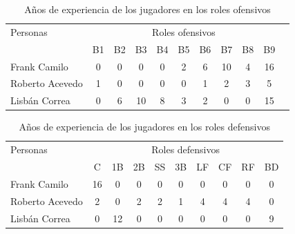 

\begin{table}[H]
		\centering
	\caption{Años de experiencia de los jugadores en los roles ofensivos}\label{exp-of}
		\begin{tabular}{l | c c c c c c c c c c}
			\toprule[1.7pt]
			\multicolumn{1}{l}{Personas}   &    \multicolumn{9}{c}{Roles ofensivos}    &  \\ \cline{1-10}
			                                                              & B1 & B2 & B3 & B4 & B5 & B6 & B7 & B8 & B9 &  \\ \cline{2-10}
			Frank Camilo                                                 & 0  & 0  & 0  & 0  & 2  & 6  & 10 & 4  & 16 &  \\
			Roberto Acevedo                                              & 1  & 0  & 0  & 0  & 0  & 1  & 2  & 3  & 5  &  \\
			Lisbán Correa                                                & 0  & 6  & 10 & 8  & 3  & 2  & 0  & 0  & 15 &  \\
			\bottomrule[1pt]                              
		\end{tabular}
	
\end{table}


\begin{table}[H]
	\centering
	\caption{Años de experiencia de los jugadores en los roles defensivos}\label{exp-def}

	\begin{tabular}{l | c c c c c c c c c }
		\toprule[1.7pt]
		\multicolumn{1}{l}{Personas} &    \multicolumn{9}{c}{Roles defensivos}  \\ \cline{1-10}
		                                                           & C  & 1B & 2B & SS & 3B & LF & CF & RF & BD \\ \cline{2-10}
		Frank Camilo                                               & 16 & 0  & 0  & 0  & 0  & 0  & 0  & 0  & 0                           \\
		Roberto Acevedo                                            & 2  & 0  & 2  & 2  & 1  & 4  & 4  & 4  & 0                            \\
		Lisbán Correa                                              & 0  & 12 & 0  & 0  & 0  & 0  & 0  & 0  & 9\\
		\bottomrule[1pt]                             
	\end{tabular}

\end{table}



